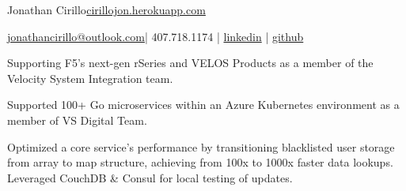 \documentclass[]{deedy-resume-openfont}
\begin{document}
%
%


\namesection \LARGE {{Jonathan} {Cirillo}}{\href{https://cirillojon.herokuapp.com/}{cirillojon.herokuapp.com}}

\vspace{18pt}

\newcommand{\linkedin}[1]{\faLinkedin\hspace{0.5em}\href{https://linkedin.com/in/#1}{\texttt{#1}}}
\newcommand{\github}[1]{\faGithub\hspace{0.5em}\href{https://github.com/#1}{\texttt{#1}}}

{\FA \faEnvelope} {\href{mailto:jonathancirillo@outlook.com}{jonathancirillo@outlook.com}}\hspace{5pt}|\hspace{5pt}{\FA \faPhone} 407.718.1174 |\hspace{5pt} {\FA \faLinkedin} {\href{https://linkedin.com/in/jonathan-cirillo/}{linkedin}} \hspace{5pt}|\hspace{5pt} {\FA \faGithub} {\href{https://github.com/cirillojon}{github}}


\vspace{6pt}



\begin{tightemize}
\item Supporting F5's next-gen rSeries and VELOS Products as a member of the Velocity System Integration team.
\end{tightemize}
\sectionsep


\begin{tightemize}
\item Supported 100+ Go microservices within an Azure Kubernetes environment as a member of VS Digital Team.
\item Optimized a core service’s performance by transitioning blacklisted user storage from array to map structure, achieving from 100x to 1000x faster data lookups. Leveraged CouchDB \& Consul for local testing of updates.
\end{tightemize}
\sectionsep
\end{document}
